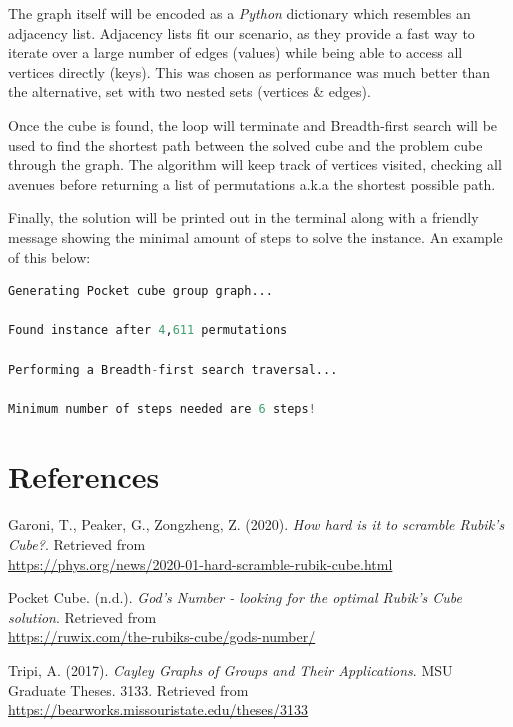 \documentclass[a4paper]{article}
\begin{document}
\par The graph itself will be encoded as a \emph{Python} dictionary which resembles an adjacency list. Adjacency lists fit our scenario, as they provide a fast way to iterate over a large number of edges (values) while being able to access all vertices directly (keys). This was chosen as performance was much better than the alternative, set with two nested sets (vertices \& edges).

\newpage

\par Once the cube is found, the loop will terminate and Breadth-first search will be used to find the shortest path between the solved cube and the problem cube through the graph. The algorithm will keep track of vertices visited, checking all avenues before returning a list of permutations a.k.a the shortest possible path. 

\par Finally, the solution will be printed out in the terminal along with a friendly message showing the minimal amount of steps to solve the instance. An example of this below:

\begin{lstlisting}[language=Python]
Generating Pocket cube group graph...

Found instance after 4,611 permutations

Performing a Breadth-first search traversal...

Minimum number of steps needed are 6 steps!
\end{lstlisting}

\section{References}
\par Garoni, T., Peaker, G., Zongzheng, Z. (2020). \emph{How hard is it to scramble Rubik's Cube?}. Retrieved from\\ \url{https://phys.org/news/2020-01-hard-scramble-rubik-cube.html}

\par Pocket Cube. (n.d.). \emph{God's Number - looking for the optimal Rubik's Cube solution}. Retrieved from\\ \url{https://ruwix.com/the-rubiks-cube/gods-number/}

\par Tripi, A. (2017). \emph{Cayley Graphs of Groups and Their Applications}. MSU Graduate Theses. 3133. Retrieved from\\ \url{https://bearworks.missouristate.edu/theses/3133}
\end{document}
